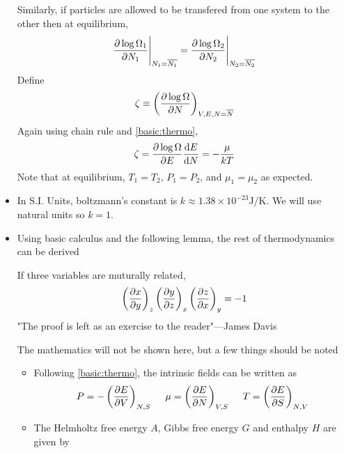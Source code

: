 \documentclass{article}
\begin{document}
\begin{itemize}
\begin{derivation}
        Similarly, if particles are allowed to be transfered from one system to the other then at equilibrium,
        \begin{equation}
            \partialderivative{\log\Omega_1}{N_1}\Bigg|_{N_1=\overline{N_1}}=\partialderivative{\log\Omega_2}{N_2}\Bigg|_{N_2=\overline{N_2}}
        \end{equation}
        Define
        \begin{equation}
            \zeta\equiv\left(\partialderivative{\log\Omega}{N}\right)_{V,E,N=\overline{N}}
        \end{equation}
        Again using chain rule and \eqref{basic:thermo},
        \begin{equation}
            \zeta=\partialderivative{\log\Omega}{E}\derivative{E}{N}=-\frac{\mu}{kT}
        \end{equation}
        Note that at equilibrium, $T_1=T_2$, $P_1=P_2$, and $\mu_1=\mu_2$ as expected.
    \end{derivation}
    \item In S.I. Units, boltzmann's constant is $k\approx1.38\times10^{-23}$J/K. We will use natural units so $k=1$.
    \item Using basic calculus and the following lemma, the rest of thermodynamics can be derived
    \begin{lemma}
        If three variables are muturally related,
        \begin{equation}
            \left(\partialderivative{x}{y}\right)_z\left(\partialderivative{y}{z}\right)_x\left(\partialderivative{z}{x}\right)_y=-1
        \end{equation}
        "The proof is left as an exercise to the reader"---James Davis
    \end{lemma}
    The mathematics will not be shown here, but a few things should be noted
    \begin{itemize}
        \item Following \eqref{basic:thermo}, the intrinsic fields can be written as
        \begin{equation}
            P=-\left(\partialderivative{E}{V}\right)_{N,S}\:\:\:\:\:\:\mu=\left(\partialderivative{E}{N}\right)_{V,S}\:\:\:\:\:\:T=\left(\partialderivative{E}{S}\right)_{N,V}\label{intrinsic-fields}
        \end{equation}
        \item The Helmholtz free energy $A$, Gibbs free energy $G$ and enthalpy $H$ are given by
        \begin{align}

\end{align}
\end{itemize}
\end{itemize}
\end{document}
